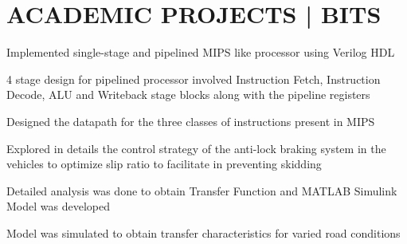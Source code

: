 \documentclass[]{deedy-resume-openfont}
\begin{document}
\begin{minipage}[t]{0.66\textwidth}

\section{ACADEMIC PROJECTS | BITS}
\vspace{\topsep}

\descript{}
\begin{tightemize}
\justifying
\item Implemented single-stage and pipelined MIPS like processor using Verilog HDL 
\item 4 stage design for pipelined processor involved Instruction Fetch, Instruction Decode, ALU and Writeback stage blocks along with the pipeline registers 
\item Designed the datapath for the three classes of instructions present in MIPS
\end{tightemize}
\sectionsep


\descript{}
\begin{tightemize}
\justifying
\item Explored in details the control strategy of the anti-lock braking system in the vehicles to optimize slip ratio to facilitate in preventing skidding 
\item Detailed analysis was done to obtain Transfer Function and MATLAB Simulink Model was developed
\item Model was simulated to obtain transfer characteristics for varied road conditions
\end{tightemize}
\sectionsep

\end{minipage} 
\end{document}
